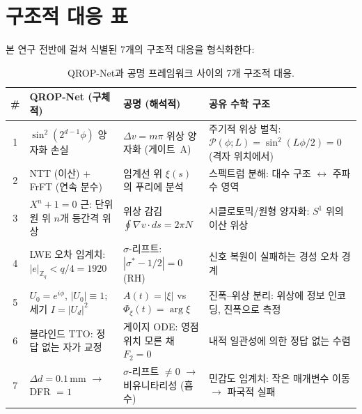 \documentclass[11pt, a4paper]{article}
\theoremstyle{definition}
\theoremstyle{plain}
\newcommand{\Zq}{\mathbb{Z}_q}
\newcommand{\xif}{\xi}
\newcommand{\Phiz}{\Phi_\xi}
\newcommand{\Ampl}{A}
\begin{document}
\section{구조적 대응 표}
\label{sec:correspondence}

본 연구 전반에 걸쳐 식별된 7개의 구조적 대응을 형식화한다:

\begin{table}[ht]
\centering
\caption{QROP-Net과 공명 프레임워크 사이의 7개 구조적 대응.}
\label{tab:correspondence}
\small
\begin{tabular}{@{} c p{3.5cm} p{3.5cm} p{4.5cm} @{}}
\toprule
\textbf{\#} & \textbf{QROP-Net (구체적)} & \textbf{공명 (해석적)}
& \textbf{공유 수학 구조} \\
\midrule
1 & $\sin^2(2^{d-1}\phi)$ 양자화 손실
  & $\Delta v = m\pi$ 위상 양자화 (게이트~A)
  & 주기적 위상 벌칙: $\mathcal{P}(\phi;L) = \sin^2(L\phi/2) = 0$
    (격자 위치에서) \\

2 & NTT (이산) $+$ FrFT (연속 분수)
  & 임계선 위 $\xif(s)$의 푸리에 분석
  & 스펙트럼 분해: 대수 구조 $\leftrightarrow$ 주파수 영역 \\

3 & $X^n + 1 = 0$ 근: 단위원 위 $n$개 등간격 위상
  & 위상 감김 $\oint\nabla v \cdot ds = 2\pi N$
  & 시클로토믹/원형 양자화: $S^1$ 위의 이산 위상 \\

4 & LWE 오차 임계치: $|e|_{\Zq} < q/4 = 1920$
  & $\sigma$-리프트: $|\sigma^* - 1/2| = 0$ (RH)
  & 신호 복원이 실패하는 경성 오차 경계 \\

5 & $U_0 = e^{i\phi}$, $|U_0| \equiv 1$; 세기 $I = |U_d|^2$
  & $\Ampl(t) = |\xif|$ vs $\Phiz(t) = \arg\xif$
  & 진폭--위상 분리: 위상에 정보 인코딩, 진폭으로 측정 \\

6 & 블라인드 TTO: 정답 없는 자가 교정
  & 게이지 ODE: 영점 위치 모른 채 $F_2 = 0$
  & 내적 일관성에 의한 정답 없는 수렴 \\

7 & $\Delta d = 0.1\,$mm $\to$ DFR $= 1$
  & $\sigma$-리프트 $\neq 0$ $\to$ 비유니타리성 (흡수)
  & 민감도 임계치: 작은 매개변수 이동 $\to$ 파국적 실패 \\
\bottomrule
\end{tabular}
\end{table}
\end{document}
